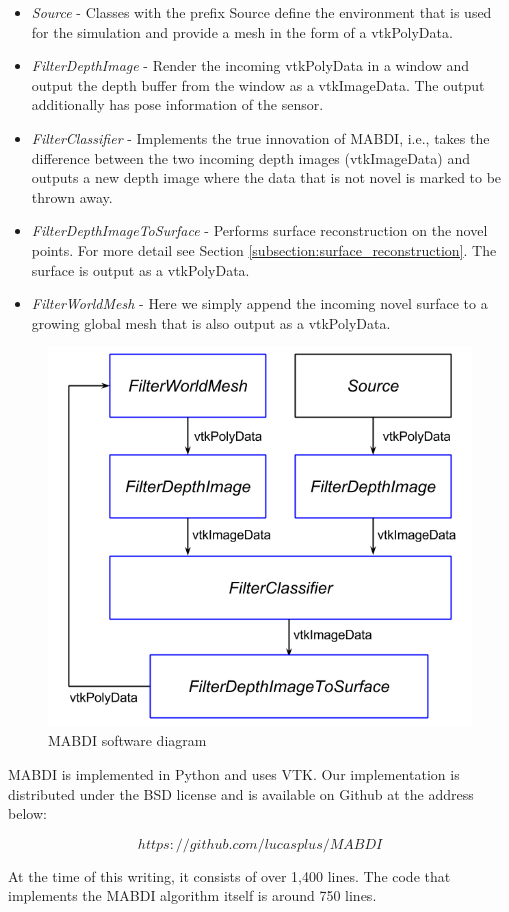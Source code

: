 \begin{sloppypar}
\begin{itemize}
    \item  \textit{Source} - Classes with the prefix Source define the
    environment that is used for the simulation and provide a mesh in the form
    of a vtkPolyData.
    \item \textit{FilterDepthImage} - Render the incoming vtkPolyData in a
    window and output the depth buffer from the window as a vtkImageData. The
    output additionally has pose information of the sensor.
    \item \textit{FilterClassifier} - Implements the true innovation of MABDI,
    i.e., takes the difference between the two incoming depth images
    (vtkImageData) and outputs a new depth image where the data that is not
    novel is marked to be thrown away.
    \item \textit{FilterDepthImageToSurface} - Performs surface reconstruction
    on the novel points. For more detail see Section
    \ref{subsection:surface_reconstruction}. The surface is output as a
    vtkPolyData.
    \item \textit{FilterWorldMesh} - Here we simply append the incoming novel
    surface to a growing global mesh that is also output as a vtkPolyData.
\end{itemize}
\end{sloppypar}

\begin{figure}[b]%
\centering
\includegraphics[width=.75\textwidth]{figures/diagram_software.png}
\caption{MABDI software diagram}
\label{fig:software}
\end{figure}

MABDI is implemented in Python and uses VTK. Our implementation is distributed
under the BSD license and is available on Github at the address below:

$$
https://github.com/lucasplus/MABDI
$$

At the time of this writing, it consists of over 1,400 lines. The code that
implements the MABDI algorithm itself is around 750 lines.
